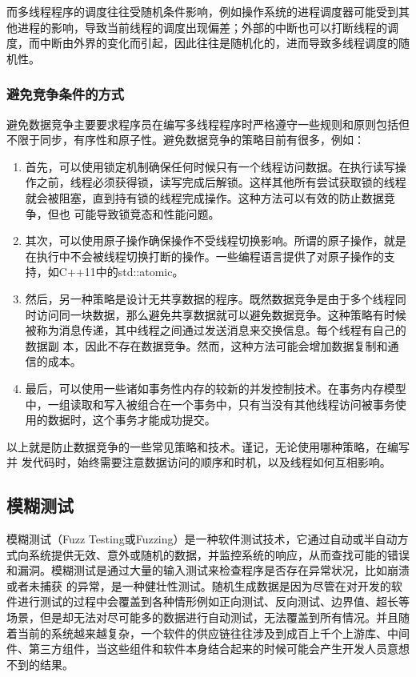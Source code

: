 而多线程程序的调度往往受随机条件影响，例如操作系统的进程调度器可能受到其他进程的影响，导致当前线程的调度出现偏差；外部的中断也可以打断线程的调度，而中断由外界的变化而引起，因此往往是随机化的，进而导致多线程调度的随机性。

\subsubsection{避免竞争条件的方式}

避免数据竞争主要要求程序员在编写多线程程序时严格遵守一些规则和原则包括但不限于同步，有序性和原子性。避免数据竞争的策略目前有很多，例如：

\begin{enumerate}
\item 首先，可以使用锁定机制确保任何时候只有一个线程访问数据。在执行读写操作之前，线程必须获得锁，读写完成后解锁。这样其他所有尝试获取锁的线程就会被阻塞，直到持有锁的线程完成操作。这种方法可以有效的防止数据竞争，但也 可能导致锁竞态和性能问题。
\item 其次，可以使用原子操作确保操作不受线程切换影响。所谓的原子操作，就是在执行中不会被线程切换打断的操作。一些编程语言提供了对原子操作的支持，如C++11中的std::atomic。
\item 然后，另一种策略是设计无共享数据的程序。既然数据竞争是由于多个线程同时访问同一块数据，那么避免共享数据就可以避免数据竞争。这种策略有时候被称为消息传递，其中线程之间通过发送消息来交换信息。每个线程有自己的数据副 本，因此不存在数据竞争。然而，这种方法可能会增加数据复制和通信的成本。
\item 最后，可以使用一些诸如事务性内存的较新的并发控制技术。在事务内存模型中，一组读取和写入被组合在一个事务中，只有当没有其他线程访问被事务使用的数据时，这个事务才能成功提交。
\end{enumerate}

以上就是防止数据竞争的一些常见策略和技术。谨记，无论使用哪种策略，在编写并 发代码时，始终需要注意数据访问的顺序和时机，以及线程如何互相影响。

\subsection{模糊测试}

模糊测试（Fuzz Testing或Fuzzing）是一种软件测试技术，它通过自动或半自动方式向系统提供无效、意外或随机的数据，并监控系统的响应，从而查找可能的错误和漏洞。模糊测试是通过大量的输入测试来检查程序是否存在异常状况，比如崩溃或者未捕获 的异常，是一种健壮性测试。随机生成数据是因为尽管在对开发的软件进行测试的过程中会覆盖到各种情形例如正向测试、反向测试、边界值、超长等场景，但是却无法对尽可能多的数据进行自动测试，无法覆盖到所有情况。并且随着当前的系统越来越复杂，一个软件的供应链往往涉及到成百上千个上游库、中间件、第三方组件，当这些组件和软件本身结合起来的时候可能会产生开发人员意想不到的结果。

